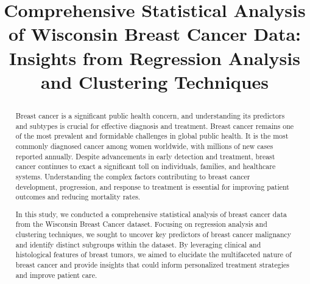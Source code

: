 \documentclass[conference]{IEEEtran}
\begin{document}
\title{\begin{center} Comprehensive Statistical Analysis of Wisconsin Breast Cancer Data: Insights from Regression Analysis and Clustering Techniques\end{center}

}

\author{
\and

\and

}



\maketitle

\begin{abstract}
Breast cancer is a significant public health concern, and understanding its predictors and subtypes is crucial for effective diagnosis and treatment. Breast cancer remains one of the most prevalent and formidable challenges in global public health. It is the most commonly diagnosed cancer among women worldwide, with millions of new cases reported annually. Despite advancements in early detection and treatment, breast cancer continues to exact a significant toll on individuals, families, and healthcare systems. Understanding the complex factors contributing to breast cancer development, progression, and response to treatment is essential for improving patient outcomes and reducing mortality rates.

In this study, we conducted a comprehensive statistical analysis of breast cancer data from the Wisconsin Breast Cancer dataset. Focusing on regression analysis and clustering techniques, we sought to uncover key predictors of breast cancer malignancy and identify distinct subgroups within the dataset. By leveraging clinical and histological features of breast tumors, we aimed to elucidate the multifaceted nature of breast cancer and provide insights that could inform personalized treatment strategies and improve patient care.
\end{abstract}
\end{document}
